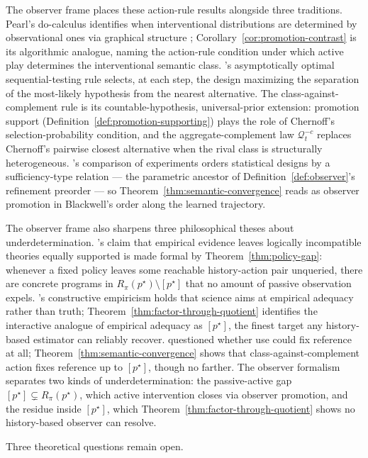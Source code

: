 \documentclass[11pt]{article}
\theoremstyle{definition}
\theoremstyle{remark}
\newcommand{\Qcal}{\mathcal{Q}}
\begin{document}
The observer frame places these action-rule results alongside three traditions. Pearl's do-calculus identifies when interventional distributions are determined by observational ones via graphical structure \citep{Pearl2009}; Corollary~\ref{cor:promotion-contrast} is its algorithmic analogue, naming the action-rule condition under which active play determines the interventional semantic class. \citet{Chernoff1959}'s asymptotically optimal sequential-testing rule selects, at each step, the design maximizing the separation of the most-likely hypothesis from the nearest alternative. The class-against-complement rule is its countable-hypothesis, universal-prior extension: promotion support (Definition~\ref{def:promotion-supporting}) plays the role of Chernoff's selection-probability condition, and the aggregate-complement law $\Qcal_t^{-c}$ replaces Chernoff's pairwise closest alternative when the rival class is structurally heterogeneous. \citet{Blackwell1953}'s comparison of experiments orders statistical designs by a sufficiency-type relation --- the parametric ancestor of Definition~\ref{def:observer}'s refinement preorder --- so Theorem~\ref{thm:semantic-convergence} reads as observer promotion in Blackwell's order along the learned trajectory.

The observer frame also sharpens three philosophical theses about underdetermination. \citet{Quine1960}'s claim that empirical evidence leaves logically incompatible theories equally supported is made formal by Theorem~\ref{thm:policy-gap}: whenever a fixed policy leaves some reachable history-action pair unqueried, there are concrete programs in $R_\pi(p^\star)\setminus[p^\star]$ that no amount of passive observation expels. \citet{vanFraassen1980}'s constructive empiricism holds that science aims at empirical adequacy rather than truth; Theorem~\ref{thm:factor-through-quotient} identifies the interactive analogue of empirical adequacy as $[p^\star]$, the finest target any history-based estimator can reliably recover. \citet{Putnam1980} questioned whether use could fix reference at all; Theorem~\ref{thm:semantic-convergence} shows that class-against-complement action fixes reference up to $[p^\star]$, though no farther. The observer formalism separates two kinds of underdetermination: the passive-active gap $[p^\star]\subsetneq R_\pi(p^\star)$, which active intervention closes via observer promotion, and the residue inside $[p^\star]$, which Theorem~\ref{thm:factor-through-quotient} shows no history-based observer can resolve.

Three theoretical questions remain open.
\end{document}
